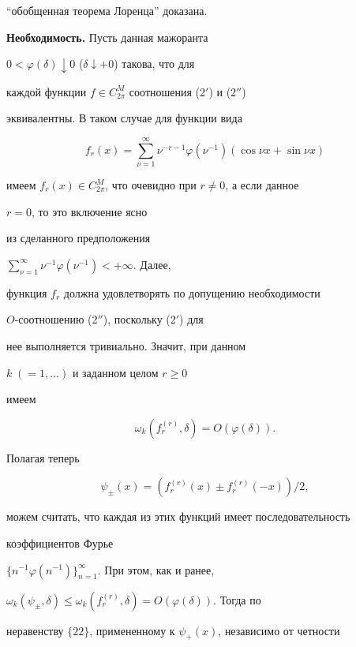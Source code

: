 ``обобщенная теорема Лоренца'' доказана.


\medskip





{\bf Необходимость.} Пусть данная мажоранта


$0<\varphi(\delta)\downarrow 0$ ($\delta\downarrow +0$) такова, что для


каждой функции $f\in C^M_{2\pi}$ соотношения (2$'$) и (2$''$)


эквивалентны. В таком случае для функции вида


$$


f_r(x)=\sum^\infty_{\nu=1}\nu^{-r-1}


\varphi(\nu^{-1})(\cos\nu x+\sin\nu x)


$$


имеем $f_r(x)\in C^M_{2\pi}$, что очевидно при $r\ne 0$, а если данное


$r=0$, то это включение ясно


из сделанного предположения


$\sum\limits^\infty_{\nu=1}\nu^{-1}\varphi(\nu^{-1})<+\infty$. Далее,


функция $f_r$ должна удовлетворять по допущению необходимости


$O$-соотношению (2$''$), поскольку (2$'$) для


нее выполняется тривиально. Значит, при данном


$k\;(=1,\dotsc)$ и заданном целом $r\ge 0$


имеем


$$


\omega_k(f^{(r)}_r,\delta)=O(\varphi(\delta)).


$$


Полагая теперь


$$


\psi_\pm(x)=(f^{(r)}_r(x)\pm f^{(r)}_r(-x))/2,


$$


можем считать, что каждая из этих функций имеет последовательность


коэффициентов Фурье


$\{n^{-1}\varphi(n^{-1})\}^\infty_{n=1}$. При этом, как и ранее,


$\omega_k(\psi_\pm,\delta)\le\omega_k(f^{(r)}_r,\delta)=


O(\varphi(\delta))$. Тогда по


неравенству $\{22\}$, примененному к $\psi_+(x)$, независимо от четности


